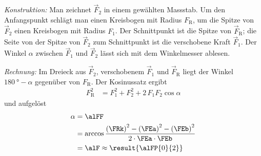 \emph{Konstruktion:} Man zeichnet $\vec F_2$ in einem gewählten Massstab. Um den Anfangspunkt schlägt man einen Kreisbogen mit Radius $F_\text{R}$, um die Spitze von $\vec F_2$ einen Kreisbogen mit Radius $F_1$. Der Schnittpunkt ist die Spitze von $\vec F_\text{R}$; die Seite von der Spitze von $\vec F_2$ zum Schnittpunkt ist die verschobene Kraft $\vec F_1$. Der Winkel $\alpha$ zwischen $\vec F_1$ und $\vec F_2$ lässt sich mit dem Winkelmesser ablesen.
\begin{center}
\end{center}

\emph{Rechnung:} Im Dreieck aus $\vec F_2$, verschobenem $\vec F_1$ und $\vec F_\text{R}$ liegt der Winkel $\SI{180}{\degree}-\alpha$ gegenüber von $F_\text{R}$. Der Kosinussatz ergibt
\begin{align}
 F_\text{R}^2 &= F_1^2+F_2^2+2\,F_1F_2\cos\alpha
\end{align}
und aufgelöst
\begin{align}
 \alpha &= \alFF \\
   &= \arccos\frac{\left(\FRk\right)^2-\left(\FEa\right)^2-\left(\FEb\right)^2}{2\cdot\FEa\cdot\FEb} \\
   &= \alF \approx \result{\alFP{0}{2}}
\end{align}
